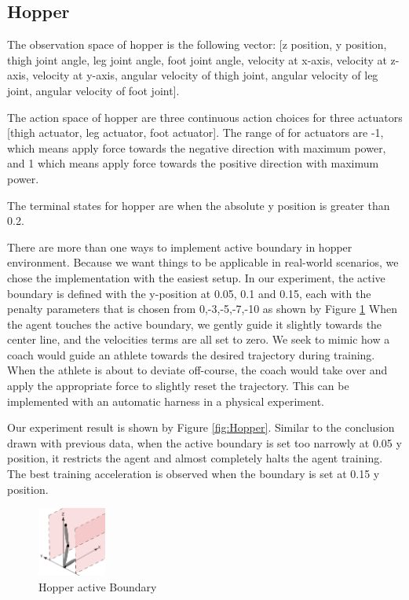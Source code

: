 \documentclass[journal]{IEEEtran}
\begin{document}
\subsection{Hopper}
The observation space of hopper is the following vector: [z position, y position, thigh joint angle, leg joint angle, foot joint angle, velocity at x-axis, velocity at z-axis, velocity at y-axis, angular velocity of thigh joint, angular velocity of leg joint, angular velocity of foot joint].

The action space of hopper are three continuous action choices for three actuators [thigh actuator, leg actuator, foot actuator]. The range of for actuators are -1, which means apply force towards the negative direction with maximum power, and 1 which means apply force towards the positive direction with maximum power.

The terminal states for hopper are when the absolute y position is greater than 0.2.

There are more than one ways to implement active boundary in hopper environment. Because we want things to be applicable in real-world scenarios, we chose the implementation with the easiest setup. In our experiment, the active boundary is defined with the y-position at 0.05, 0.1 and 0.15, each with the penalty parameters that is chosen from 0,-3,-5,-7,-10 as shown by Figure \ref{fig:hopperPB} When the agent touches the active boundary, we gently guide it slightly towards the center line, and the velocities terms are all set to zero. We seek to mimic how a coach would guide an athlete towards the desired trajectory during training. When the athlete is about to deviate off-course, the coach would take over and apply the appropriate force to slightly reset the trajectory. This can be implemented with an automatic harness in a physical experiment.

Our experiment result is shown by Figure \ref{fig:Hopper}. Similar to the conclusion drawn with previous data, when the active boundary is set too narrowly at 0.05 y position, it restricts the agent and almost completely halts the agent training. The best training acceleration is observed when the boundary is set at 0.15 y position.

\begin{figure}
     \centering
      \includegraphics[width=0.2\textwidth]{hopper.png}
      \caption{Hopper active Boundary}
      \label{fig:hopperPB}
\end{figure}
\end{document}
